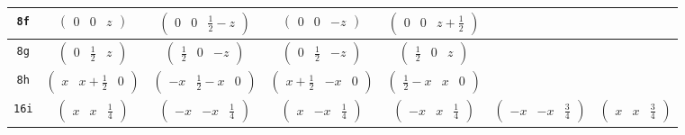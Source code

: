 \documentclass[fleqn,9pt,landscape]{jsarticle}
\begin{document}
\begin{center}
\begin{longtable}{ccccccc}
{\tt 8f} & $ \begin{pmatrix} 0 & 0 & z \end{pmatrix} $ & $ \begin{pmatrix} 0 & 0 & \frac{1}{2} - z \end{pmatrix} $ & $ \begin{pmatrix} 0 & 0 & - z \end{pmatrix} $ & $ \begin{pmatrix} 0 & 0 & z + \frac{1}{2} \end{pmatrix} $ & $  $ & $  $ \\ \hline
{\tt 8g} & $ \begin{pmatrix} 0 & \frac{1}{2} & z \end{pmatrix} $ & $ \begin{pmatrix} \frac{1}{2} & 0 & - z \end{pmatrix} $ & $ \begin{pmatrix} 0 & \frac{1}{2} & - z \end{pmatrix} $ & $ \begin{pmatrix} \frac{1}{2} & 0 & z \end{pmatrix} $ & $  $ & $  $ \\ \hline
{\tt 8h} & $ \begin{pmatrix} x & x + \frac{1}{2} & 0 \end{pmatrix} $ & $ \begin{pmatrix} - x & \frac{1}{2} - x & 0 \end{pmatrix} $ & $ \begin{pmatrix} x + \frac{1}{2} & - x & 0 \end{pmatrix} $ & $ \begin{pmatrix} \frac{1}{2} - x & x & 0 \end{pmatrix} $ & $  $ & $  $ \\ \hline
{\tt 16i} & $ \begin{pmatrix} x & x & \frac{1}{4} \end{pmatrix} $ & $ \begin{pmatrix} - x & - x & \frac{1}{4} \end{pmatrix} $ & $ \begin{pmatrix} x & - x & \frac{1}{4} \end{pmatrix} $ & $ \begin{pmatrix} - x & x & \frac{1}{4} \end{pmatrix} $ & $ \begin{pmatrix} - x & - x & \frac{3}{4} \end{pmatrix} $ & $ \begin{pmatrix} x & x & \frac{3}{4} \end{pmatrix} $ \\

\end{longtable}
\end{center}
\end{document}

